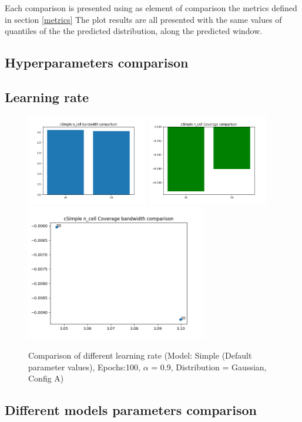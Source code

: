 \documentclass[a4paper, 12pt]{article}
\begin{document}
Each comparison is presented using as element of comparison the metrics defined in section \ref{metrics}
The plot results are all presented with the same values of quantiles of the the predicted distribution, along the predicted window.

\subsection{Hyperparameters comparison}

\subsection{Learning rate}

\begin{figure}
    \centering
    \includegraphics[width=200px]{plots/hist/a/cSimple/n_cell/bandwidth.png}
    \includegraphics[width=200px]{plots/hist/a/cSimple/n_cell/Coverage.png}
    \includegraphics[width=300px]{plots/scatter/a/cSimple/n_cell/Coverage_bandwidth.png}
    \caption{Comparison of different learning rate (Model: Simple (Default parameter values), Epochs:100, $\alpha$ = 0.9, Distribution = Gaussian, Config A)}
    \label{fig:gausslaplace}
\end{figure}
\subsection{Different models parameters comparison}
\end{document}
